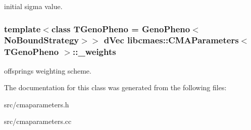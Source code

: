 initial sigma value. \hypertarget{classlibcmaes_1_1CMAParameters_aa8eeb4ea2a91da73f1d53fa74d950049}{
\subsubsection[{\-\_\-weights}]{\setlength{\rightskip}{0pt plus 5cm}template$<$class T\-Geno\-Pheno = Geno\-Pheno$<$\-No\-Bound\-Strategy$>$$>$ d\-Vec {\bf libcmaes\-::\-C\-M\-A\-Parameters}$<$ T\-Geno\-Pheno $>$\-::\-\_\-weights}}\label{classlibcmaes_1_1CMAParameters_aa8eeb4ea2a91da73f1d53fa74d950049}
offsprings weighting scheme. 

The documentation for this class was generated from the following files\-:\begin{DoxyCompactItemize}
\item 
src/cmaparameters.\-h\item 
src/cmaparameters.\-cc\end{DoxyCompactItemize}
